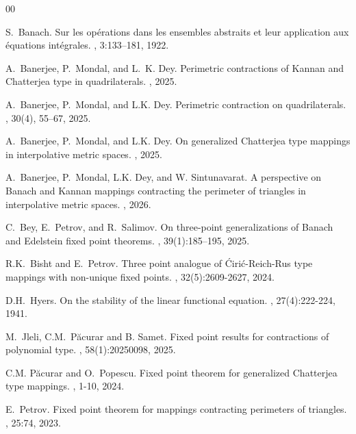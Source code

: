 \documentclass[11pt,reqno,a4paper]{amsart}
\theoremstyle{plain}
\theoremstyle{definition}
\theoremstyle{remark}
\numberwithin{equation}{section}
\begin{document}

\begin{thebibliography}{00}

S.~Banach.
\newblock Sur les op\'erations dans les ensembles abstraits et leur application aux \'equations int\'egrales.
, 3:133--181, 1922.

A.~Banerjee, P.~Mondal, and L.~K. Dey.
\newblock Perimetric contractions of Kannan and Chatterjea type in quadrilaterals.
, 2025.
	
A.~Banerjee, P.~Mondal, and L.K. Dey.
\newblock Perimetric contraction on quadrilaterals.
, 30(4), 55--67, 2025.

A.~Banerjee, P.~Mondal, and L.K. Dey.
\newblock On generalized Chatterjea type mappings in interpolative metric spaces.
, 2025.

A.~Banerjee, P.~Mondal, L.K. Dey, and W. Sintunavarat.
\newblock A perspective on Banach and Kannan mappings contracting the perimeter of triangles in interpolative metric spaces.
, 2026.

C.~Bey, E.~Petrov, and R.~Salimov.
\newblock On three-point generalizations of {B}anach and {E}delstein fixed point theorems.
, 39(1):185--195, 2025.

R.K.~Bisht and E.~Petrov.
\newblock Three point analogue of {Ć}irić-{R}eich-{R}us type mappings with non-unique fixed points.
, 32(5):2609-2627, 2024.

D.H.~Hyers.
\newblock On the stability of the linear functional equation.
, 27(4):222-224, 1941.

M.~Jleli, C.M.~P{\u{a}}curar and B. Samet.
\newblock Fixed point results for contractions of polynomial type.
, 58(1):20250098, 2025.

C.M. P{\u{a}}curar and O.~Popescu.
\newblock Fixed point theorem for generalized {C}hatterjea type mappings.
, 1-10, 2024.

E.~Petrov.
\newblock Fixed point theorem for mappings contracting perimeters of triangles.
, 25:74, 2023.


\end{thebibliography}
\end{document}
